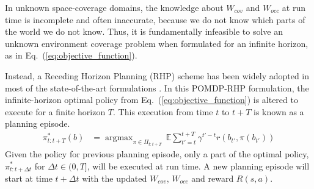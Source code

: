 \documentclass[letterpaper]{article} %
\newcommand{\phdone}[1]{} %
\newcommand{\argmax}{\mathop{\mathrm{argmax}}}
\begin{document}
\phdone{Receding Horizon Planning}
In unknown space-coverage domains, the knowledge about $W_{cov}$ and $W_{occ}$ at run time is incomplete and often inaccurate, because we do not know which parts of the world we do not know.
%
Thus, it is fundamentally infeasible to solve an unknown environment coverage problem when formulated for an infinite horizon, as in Eq.~(\ref{eq:objective_function}).

\phdone{RHP Objective Function}
Instead, a Receding Horizon Planning (RHP) scheme has been widely adopted in most of the state-of-the-art formulations \cite{bircher2016receding}.
In this POMDP-RHP formulation, the infinite-horizon optimal policy from Eq.~(\ref{eq:objective_function}) is altered to execute for a finite horizon $T$. This execution from time $t$ to $t+T$ is known as a planning episode.
\begin{align}
  \pi_{t:t+T}^*(b) &= \argmax_{\pi \in \Pi_{t:t+T}} \, \mathbb{E} \sum_{t'=t}^{t+T} \gamma^{t'-t} r(b_{t'}, \pi(b_{t'}))
  \label{eq:receding_objective_function}
\end{align}
Given the policy for previous planning episode, only a part of the optimal policy, $\pi^*_{t:t+\Delta t}$ for $\Delta t \in (0, T]$, will be executed at run time. A new planning episode will start at time $t+\Delta t$ with the updated $W_{cov}$, $W_{occ}$ and reward $R(s,a)$.




\end{document}
